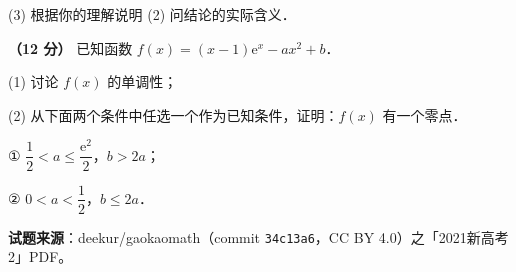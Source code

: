   (3) 根据你的理解说明 (2) 问结论的实际含义．

\textbf{（12 分）} 已知函数 $f(x)=(x-1)\mathrm e^{x}-ax^{2}+b$．

  (1) 讨论 $f(x)$ 的单调性；

  (2) 从下面两个条件中任选一个作为已知条件，证明：$f(x)$ 有一个零点．

  ① $\dfrac12<a\le\dfrac{\mathrm e^{2}}2$，$b>2a$；

  ② $0<a<\dfrac12$，$b\le2a$．

\par\medskip

\begin{gktip}
\textbf{试题来源}：deekur/gaokaomath（commit \texttt{34c13a6}，CC BY 4.0）之「2021新高考2」PDF。
\end{gktip}
